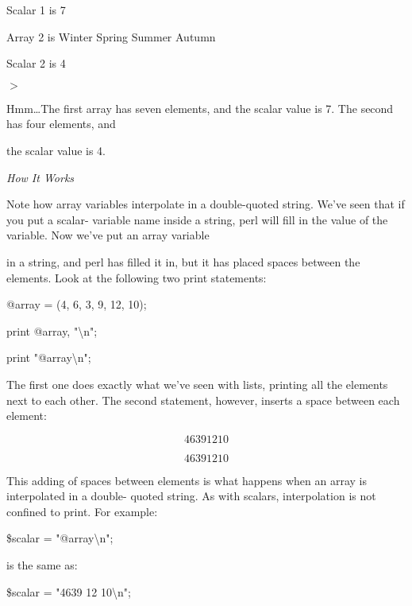 \documentclass[a4paper,11pt]{book}
\begin{document}
\noindent Scalar 1 is 7

\noindent Array 2 is Winter Spring Summer Autumn

\noindent Scalar 2 is 4

\noindent $>$

\noindent 

\noindent 

\noindent Hmm\dots  The first array has seven elements, and the scalar value is 7. The second has four elements, and

\noindent the scalar value is 4.

\noindent 

\noindent \textit{How It Works}

\noindent Note how array variables interpolate in a double-quoted string. We've seen that if you put a scalar- variable name inside a string, perl will fill in the value of the variable. Now we've put an array variable

\noindent in a string, and perl has filled it in, but it has placed spaces between the elements. Look at the following two print statements:

\noindent 

\noindent @array = (4, 6, 3, 9, 12, 10);

\noindent print @array, "\textbackslash n";

\noindent print "@array\textbackslash n";

\noindent 

\noindent The first one does exactly what we've seen with lists, printing all the elements next to each other. The second statement, however, inserts a space between each element:

\noindent 

\[46391210\] 

\[4 6 3 9 12 10\] 


\noindent This adding of spaces between elements is what happens when an array is interpolated in a double- quoted string. As with scalars, interpolation is not confined to print. For example:

\noindent 

\noindent \$scalar =  "@array\textbackslash n";

\noindent 

\noindent is the same as:

\noindent 

\noindent 

\noindent \$scalar = "4639 12 10\textbackslash n";
\end{document}
